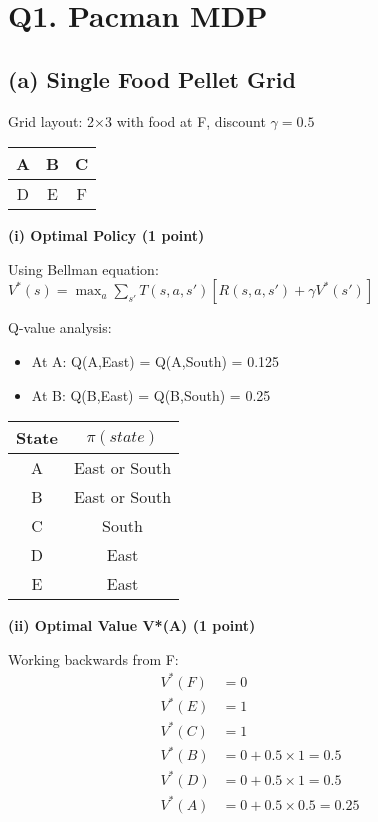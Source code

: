 \documentclass[11pt]{article}
\begin{document}
\section{Q1. Pacman MDP}

\subsection{(a) Single Food Pellet Grid}
Grid layout: 2×3 with food at F, discount $\gamma = 0.5$

\begin{center}
\begin{tabular}{|c|c|c|}
\hline
A & B & C \\
\hline
D & E & F \\
\hline
\end{tabular}
\end{center}

\textbf{(i) Optimal Policy (1 point)}

Using Bellman equation: $V^*(s) = \max_a \sum_{s'} T(s,a,s')[R(s,a,s') + \gamma V^*(s')]$

Q-value analysis:
\begin{itemize}
\item At A: Q(A,East) = Q(A,South) = 0.125
\item At B: Q(B,East) = Q(B,South) = 0.25
\end{itemize}

\begin{center}
\begin{tabular}{|c|c|}
\hline
State & $\pi(state)$ \\
\hline
A & East or South \\
B & East or South \\
C & South \\
D & East \\
E & East \\
\hline
\end{tabular}
\end{center}

\textbf{(ii) Optimal Value V*(A) (1 point)}

Working backwards from F:
\begin{align*}
V^*(F) &= 0 \\
V^*(E) &= 1 \\
V^*(C) &= 1 \\
V^*(B) &= 0 + 0.5 \times 1 = 0.5 \\
V^*(D) &= 0 + 0.5 \times 1 = 0.5 \\
V^*(A) &= 0 + 0.5 \times 0.5 = 0.25
\end{align*}
\end{document}
